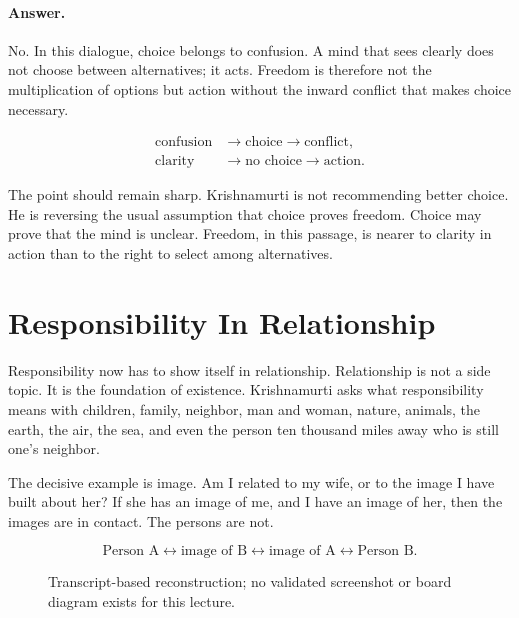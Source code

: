 \documentclass[11pt,oneside]{book}
\begin{document}
\paragraph{Answer.}
No. In this dialogue, choice belongs to confusion. A mind that sees clearly does not choose between alternatives; it acts. Freedom is therefore not the multiplication of options but action without the inward conflict that makes choice necessary.

\begin{align}
\text{confusion}
&\longrightarrow
\text{choice}
\longrightarrow
\text{conflict},\\
\text{clarity}
&\longrightarrow
\text{no choice}
\longrightarrow
\text{action}.
\end{align}

The point should remain sharp. Krishnamurti is not recommending better choice. He is reversing the usual assumption that choice proves freedom. Choice may prove that the mind is unclear. Freedom, in this passage, is nearer to clarity in action than to the right to select among alternatives.

\section{Responsibility In Relationship}

Responsibility now has to show itself in relationship. Relationship is not a side topic. It is the foundation of existence. Krishnamurti asks what responsibility means with children, family, neighbor, man and woman, nature, animals, the earth, the air, the sea, and even the person ten thousand miles away who is still one's neighbor.

The decisive example is image. Am I related to my wife, or to the image I have built about her? If she has an image of me, and I have an image of her, then the images are in contact. The persons are not.

\begin{equation}
\text{Person A}
\leftrightarrow
\text{image of B}
\leftrightarrow
\text{image of A}
\leftrightarrow
\text{Person B}.
\end{equation}

\begin{figure}
\centering
{}

Transcript-based reconstruction; no validated screenshot or board diagram exists for this lecture.
\end{figure}
\end{document}

